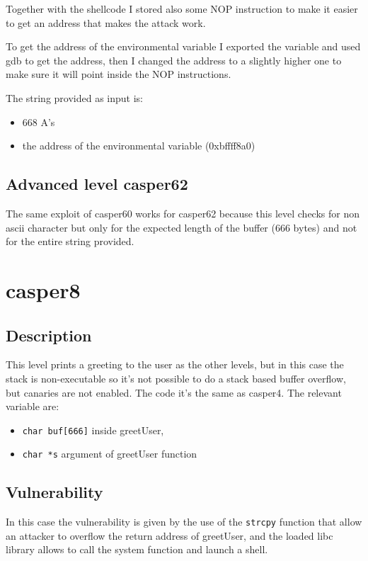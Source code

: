 \documentclass[a4paper,12pt]{article}
\begin{document}
Together with the shellcode I stored also some NOP instruction to make it easier to get an address that makes the attack work.

To get the address of the environmental variable I exported the variable and used gdb to get the address, then I changed the address to a slightly higher one to make sure it will point inside the NOP instructions.

The string provided as input is:
\begin{itemize}
\item 668 A's
\item the address of the environmental variable (0xbffff8a0)
\end{itemize}

\subsection{Advanced level casper62}

The same exploit of casper60 works for casper62 because this level checks for non ascii character but only for the expected length of the buffer (666 bytes) and not for the entire string provided.

\section{casper8}
\subsection{Description}

This level prints a greeting to the user as the other levels, but in this case the stack is non-executable so it's not possible to do a stack based buffer overflow, but canaries are not enabled. The code it's the same as casper4.
The relevant variable are:

\begin{itemize}
\item \texttt{char buf[666]} inside greetUser,
\item \texttt{char *s} argument of greetUser function
\end{itemize}

\subsection{Vulnerability}

In this case the vulnerability is given by the use of the \texttt{strcpy} function that allow an attacker to overflow the return address of greetUser, and the loaded libc library allows to call the system function and launch a shell.
\end{document}
